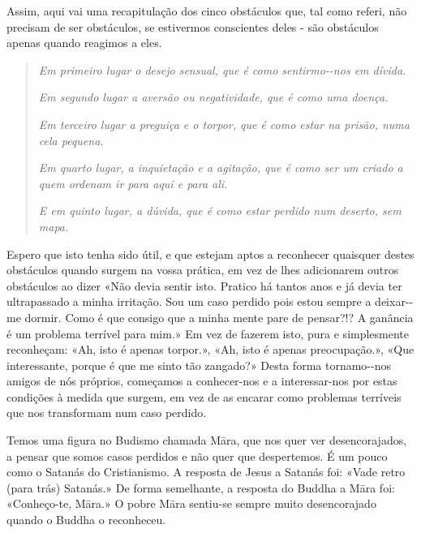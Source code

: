 Assim, aqui vai uma recapitulação dos cinco obstáculos que, tal como
referi, não precisam de ser obstáculos, se estivermos conscientes deles
- são obstáculos apenas quando reagimos a eles.

\begin{quote}
  \itshape
  Em primeiro lugar o desejo sensual, que é como sentirmo-\linebreak -nos em dívida.

  \itshape
  Em segundo lugar a aversão ou negatividade, que é como uma doença.

  \itshape
  Em terceiro lugar a preguiça e o torpor, que é como estar na prisão, numa cela pequena.

  \itshape
  Em quarto lugar, a inquietação e a agitação, que é como ser um criado a quem ordenam ir para aqui e para ali.

  \itshape
  E em quinto lugar, a dúvida, que é como estar perdido num deserto, sem mapa.
\end{quote}

Espero que isto tenha sido útil, e que estejam aptos a reconhecer
quaisquer destes obstáculos quando surgem na vossa prática, em vez de
lhes adicionarem outros obstáculos ao dizer «Não devia sentir isto.
Pratico há tantos anos e já devia ter ultrapassado a minha irritação.
Sou um caso perdido pois estou sempre a deixar-\linebreak-me dormir. Como é que
consigo que a minha mente pare de pensar?!? A ganância é um problema
terrível para mim.» Em vez de fazerem isto, pura e simplesmente
reconheçam: «Ah, isto é apenas torpor.», «Ah, isto é apenas
preocupação.», «Que interessante, porque é que me sinto tão zangado?»
Desta forma tornamo-\linebreak-nos amigos de nós próprios, começamos a \mbox{conhecer-nos}
e a interessar-nos por estas condições à medida que surgem, em vez de as
encarar como problemas terríveis que nos transformam num caso perdido.

Temos uma figura no Budismo chamada Māra, que nos quer ver
desencorajados, a pensar que somos casos perdidos e não quer que
despertemos. É um pouco como o Satanás do Cristianismo. A resposta de
Jesus a Satanás foi: «Vade retro (para trás) Satanás.» De forma
semelhante, a resposta do Buddha a Māra foi: «Conheço-te, Māra.» O pobre
Māra sentiu-se sempre muito desencorajado quando o Buddha o reconheceu.

